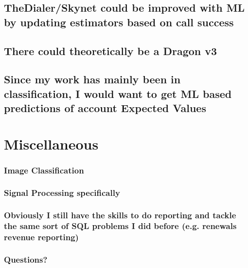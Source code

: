 \documentclass[11pt]{article}
\begin{document}
\subsection{TheDialer/Skynet could be improved with ML by updating
estimators based on call
success}\label{thedialerskynet-could-be-improved-with-ml-by-updating-estimators-based-on-call-success}

\subsection{There could theoretically be a Dragon
v3}\label{there-could-theoretically-be-a-dragon-v3}

\subsection{Since my work has mainly been in classification, I would
want to get ML based predictions of account Expected
Values}\label{since-my-work-has-mainly-been-in-classification-i-would-want-to-get-ml-based-predictions-of-account-expected-values}

    \section{Miscellaneous}\label{miscellaneous}

\subsubsection{Image Classification}\label{image-classification}

\subsubsection{Signal Processing
specifically}\label{signal-processing-specifically}

\subsubsection{Obviously I still have the skills to do reporting and
tackle the same sort of SQL problems I did before (e.g. renewals revenue
reporting)}\label{obviously-i-still-have-the-skills-to-do-reporting-and-tackle-the-same-sort-of-sql-problems-i-did-before-e.g.-renewals-revenue-reporting}

\subsubsection{Questions?}\label{questions}


    
    
    
    
\end{document}
